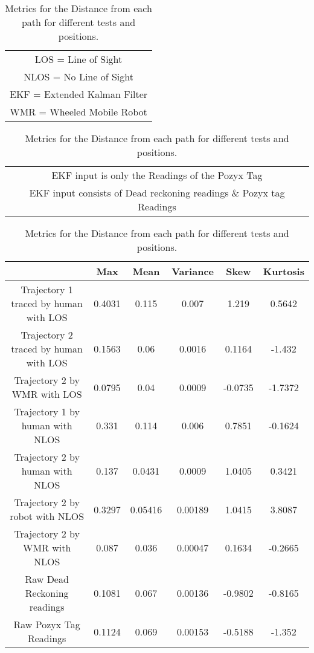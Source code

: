 \begin{table}[h!]
    \centering
    \begin{tabular}{|c|}
        \hline
        LOS = Line of Sight\\
        NLOS = No Line of Sight\\
        EKF = Extended Kalman Filter\\
        WMR = Wheeled Mobile Robot\\
    \end{tabular}
    \begin{tabular}{|c|}
        \hline
        \rowcolor{LightNavy} EKF input is only the Readings of the Pozyx Tag\\
        \rowcolor{LightGreen} EKF input consists of Dead reckoning readings \& Pozyx tag Readings\\
    \end{tabular}
    \begin{tabular}{|c|c|c|c|c|c|}
        \hline
        & Max & Mean & Variance & Skew & Kurtosis \\
        \hline
        \rowcolor{LightNavy}Trajectory 1 traced by human with LOS & 0.4031 & 0.115 & 0.007 & 1.219& 0.5642\\
        \hline
        \rowcolor{LightNavy}Trajectory 2 traced by human with LOS & 0.1563 & 0.06 & 0.0016 &0.1164 & -1.432\\
        \hline
        \rowcolor{LightNavy}Trajectory 2 by WMR with LOS & 0.0795 & 0.04 & 0.0009 & -0.0735 & -1.7372\\
        \hline
        \rowcolor{LightNavy}Trajectory 1 by human with NLOS & 0.331 & 0.114 & 0.006 & 0.7851 & -0.1624\\
        \hline
        \rowcolor{LightNavy}Trajectory 2 by human with NLOS & 0.137 & 0.0431& 0.0009 & 1.0405 & 0.3421\\
        \hline
        \rowcolor{LightNavy}Trajectory 2 by robot with NLOS &  0.3297 & 0.05416 & 0.00189 & 1.0415 & 3.8087\\
        \hline
        \rowcolor{LightGreen}Trajectory 2 by WMR with NLOS & 0.087 & 0.036 & 0.00047 & 0.1634 & -0.2665\\
        \hline
        Raw Dead Reckoning readings & 0.1081 & 0.067 & 0.00136 & -0.9802 & -0.8165\\
        \hline
        Raw Pozyx Tag Readings & 0.1124 & 0.069 & 0.00153 & -0.5188 & -1.352\\
        \hline
    \end{tabular}
    \caption{Metrics for the Distance from each path for different tests and positions.}
    \label{tb:results}
\end{table}
